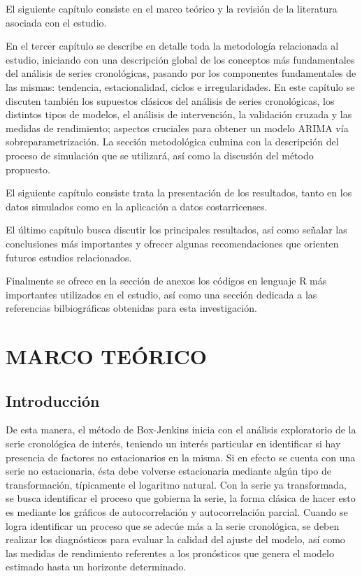 \documentclass[
]{article}
\begin{document}
El siguiente capítulo consiste en el marco teórico y la revisión de la
literatura asociada con el estudio.

En el tercer capítulo se describe en detalle toda la metodología
relacionada al estudio, iniciando con una descripción global de los
conceptos más fundamentales del análisis de series cronológicas, pasando
por los componentes fundamentales de las mismas: tendencia,
estacionalidad, ciclos e irregularidades. En este capítulo se discuten
también los supuestos clásicos del análisis de series cronológicas, los
distintos tipos de modelos, el análisis de intervención, la validación
cruzada y las medidas de rendimiento; aspectos cruciales para obtener un
modelo ARIMA vía sobreparametrización. La sección metodológica culmina
con la descripción del proceso de simulación que se utilizará, así como
la discusión del método propuesto.

El siguiente capítulo consiste trata la presentación de los resultados,
tanto en los datos simulados como en la aplicación a datos
costarricenses.

El último capítulo busca discutir los principales resultados, así como
señalar las conclusiones más importantes y ofrecer algunas
recomendaciones que orienten futuros estudios relacionados.

Finalmente se ofrece en la sección de anexos los códigos en lenguaje R
más importantes utilizados en el estudio, así como una sección dedicada
a las referencias bilbiográficas obtenidas para esta investigación.

\newpage

\section{MARCO TEÓRICO}

\subsection{Introducción}

De esta manera, el método de Box-Jenkins inicia con el análisis
exploratorio de la serie cronológica de interés, teniendo un interés
particular en identificar si hay presencia de factores no estacionarios
en la misma. Si en efecto se cuenta con una serie no estacionaria, ésta
debe volverse estacionaria mediante algún tipo de transformación,
típicamente el logaritmo natural. Con la serie ya transformada, se busca
identificar el proceso que gobierna la serie, la forma clásica de hacer
esto es mediante los gráficos de autocorrelación y autocorrelación
parcial. Cuando se logra identificar un proceso que se adecúe más a la
serie cronológica, se deben realizar los diagnósticos para evaluar la
calidad del ajuste del modelo, así como las medidas de rendimiento
referentes a los pronósticos que genera el modelo estimado hasta un
horizonte determinado.
\end{document}
